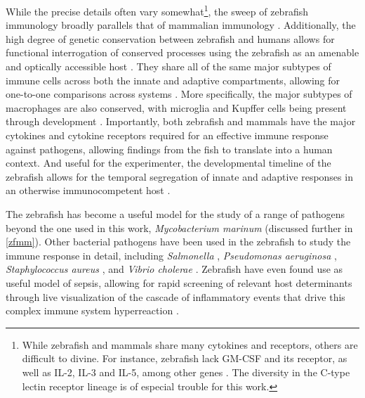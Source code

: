 While the precise details often vary somewhat\footnote{While zebrafish and mammals share many cytokines and receptors, others are difficult to divine. For instance, zebrafish lack GM\hyp{}CSF and its receptor, as well as IL\hyp{}2, IL\hyp{}3 and IL\hyp{}5, among other genes \citep{Stachura2013, Pazhakh2018, Lawir2019}. The diversity in the C\hyp{}type lectin receptor lineage is of especial trouble for this work.}, the sweep of zebrafish immunology broadly parallels that of mammalian immunology \citep{Renshaw2012, Zou2016}. Additionally, the high degree of genetic conservation between zebrafish and humans allows for functional interrogation of conserved processes using the zebrafish as an amenable and optically accessible host \citep{Gomes2020}. They share all of the same major subtypes of immune cells across both the innate and adaptive compartments, allowing for one\hyp{}to\hyp{}one comparisons across systems \citep{Thisse2002, vanderSar2004}. More specifically, the major subtypes of macrophages are also conserved, with microglia and Kupffer cells being present through development \citep{Oosterhof2015, Shwartz2019}. Importantly, both zebrafish and mammals have the major cytokines and cytokine receptors required for an effective immune response against pathogens, allowing findings from the fish to translate into a human context. And useful for the experimenter, the developmental timeline of the zebrafish allows for the temporal segregation of innate and adaptive responses in an otherwise immunocompetent host \citep{Sullivan2017, Masud2017}.

The zebrafish has become a useful model for the study of a range of pathogens beyond the one used in this work, \textit{Mycobacterium marinum} \citep{Brannon2009, Benard2012, Briolat2014} (discussed further in \autoref{zfmm}). Other bacterial pathogens have been used in the zebrafish to study the immune response in detail, including \textit{Salmonella} \citep{vanderSar2003}, \textit{Pseudomonas aeruginosa} \citep{Pont2021}, \textit{Staphylococcus aureus} \citep{Prajsnar2008}, and \textit{Vibrio cholerae} \citep{Runft2014}. Zebrafish have even found use as useful model of sepsis, allowing for rapid screening of relevant host determinants through live visualization of the cascade of inflammatory events that drive this complex immune system hyperreaction \citep{Ruyra2014, Barber2016, Philip2017}.

